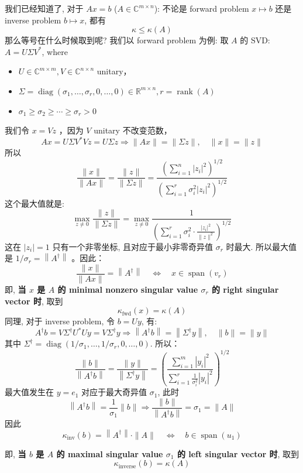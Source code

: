\documentclass[lang=cn,11pt]{elegantbook}
\begin{document}
\begin{remark}
    我们已经知道了, 对于 $Ax = b$ ($A\in \mathbb{C}^{m\times n}$): 不论是 forward problem  $x\mapsto b$ 还是 inverse problem $b \mapsto x$, 都有\[
    \kappa \leq \kappa(A)
    \]
那么等号在什么时候取到呢?    我们以 forward problem 为例: 取 $A$ 的 SVD: $A=U \Sigma V^*$, where 
    \begin{itemize}
        \item $U \in \mathbb{C}^{m \times m}, V \in \mathbb{C}^{n \times n}$ unitary，
        \item $\Sigma=\operatorname{diag}\left(\sigma_1, \ldots, \sigma_r, 0, \ldots, 0\right) \in \mathbb{R}^{m \times n}, r=\operatorname{rank}(A)$ 
        \item  $\sigma_1 \geq \sigma_2 \geq \cdots \geq \sigma_r>0$
    \end{itemize}
我们令 $x=V z$ ，因为 $V$ unitary 不改变范数，
$$
A x=U \Sigma V^* V z=U \Sigma z \Rightarrow\|A x\|=\|\Sigma z\|, \quad\|x\|=\|z\|
$$
所以 $$
\frac{\|x\|}{\|A x\|}=\frac{\|z\|}{\|\Sigma z\|}=\frac{\left(\sum_{i=1}^n\left|z_i\right|^2\right)^{1 / 2}}{\left(\sum_{i=1}^r \sigma_i^2\left|z_i\right|^2\right)^{1 / 2}}
$$
这个最大值就是: $$
\max _{z \neq 0} \frac{\|z\|}{\|\Sigma z\|}=\max _{z \neq 0} \frac{1}{\left(\sum_{i=1}^r \sigma_i^2 \cdot \frac{\left|z_i\right|^2}{\|z\|^2}\right)^{1 / 2}}
$$
这在 $\left|z_i\right|=1$ 只有一个非零坐标, 且对应于最小非零奇异值 $\sigma_r$ 时最大. 所以最大值是 $1 / \sigma_r=\left\|A^{\dagger}\right\|$ 。因此：
$$
\frac{\|x\|}{\|A x\|}=\left\|A^{\dagger}\right\| \quad \Longleftrightarrow \quad x \in \operatorname{span}\left(v_r\right)
$$ 即, \textbf{当 $x$ 是 $A$ 的 minimal nonzero singular value  $\sigma_r$ 的 right singular vector 时}, 取到 \[
\kappa_{\mathrm{fwd}}(x) = \kappa(A)
\]
同理, 对于 inverse problem, 令 $b=U y$, 有:
$$
A^{\dagger} b=V \Sigma^{\dagger} U^* U y=V \Sigma^{\dagger} y \Rightarrow\left\|A^{\dagger} b\right\|=\left\|\Sigma^{\dagger} y\right\|, \quad\|b\|=\|y\|
$$
其中 $\Sigma^{\dagger}=\operatorname{diag}\left(1 / \sigma_1, \ldots, 1 / \sigma_r, 0, \ldots, 0\right)$. 所以： $$
\frac{\|b\|}{\left\|A^{\dagger} b\right\|}=\frac{\|y\|}{\left\|\Sigma^{\dagger} y\right\|}=\left(\frac{\sum_{i=1}^m\left|y_i\right|^2}{\sum_{i=1}^r \frac{1}{\sigma_i^2}\left|y_i\right|^2}\right)^{1 / 2}
$$最大值发生在 $y=e_1$ 对应于最大奇异值 $\sigma_1$, 此时
$$
\left\|A^{\dagger} b\right\|=\frac{1}{\sigma_1}\|b\| \Rightarrow \frac{\|b\|}{\left\|A^{\dagger} b\right\|}=\sigma_1=\|A\|
$$
因此
$$
\kappa_{\mathrm{inv}}(b)=\left\|A^{\dagger}\right\| \cdot\|A\| \quad \Longleftrightarrow \quad b \in \operatorname{span}\left(u_1\right)
$$

 即, \textbf{当 $b$ 是 $A$ 的 maximal singular value  $\sigma_1$ 的 left singular vector 时}, 取到 \[
\kappa_{\mathrm{inverse}}(b) = \kappa(A)
\]
\end{remark}
\end{document}
